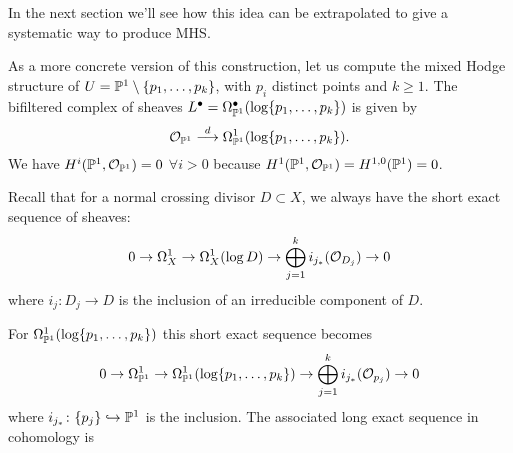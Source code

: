 \documentclass[../main.tex]{subfiles}
\begin{document}
In the next section we'll see how this idea can be extrapolated to give a systematic way to produce MHS.



\begin{es} 
\label{example-MHS3}
As a more concrete version of this construction, let us compute the mixed Hodge structure of $U = \mathbb{P}^1\setminus\{p_1,\ldots,p_k\}$, with $p_i$ distinct points and $k\ge 1$. The bifiltered complex of sheaves $L^\bullet = \Omega_{\mathbb{P}^1}^\bullet(\log \{p_1,\ldots,p_k\})$ is given by
\[\mathcal{O}_{\mathbb{P}^1}\stackrel{d}{\longrightarrow}\Omega^1_{\mathbb{P}^1}(\log\{p_1,\ldots,p_k\}).\]
We have $H^i(\mathbb{P}^1,\mathcal{O}_{\mathbb{P}^1})= 0$  $\forall i > 0$ because $H^1(\mathbb{P}^1,\mathcal{O}_{\mathbb{P}^1})=H^{1,0}(\mathbb{P}^1)=0$. 

Recall that for a normal crossing divisor $D \subset X$, we always have the short exact sequence of sheaves:
\[
0 \to \Omega^1_X \to \Omega^1_X(\log D) \to \bigoplus_{j=1}^k i_{j_*}(\mathcal{O}_{D_j}) \to 0
\]
where $i_{j} \colon D_j \to D$ is the inclusion of an irreducible component of $D$.


For  $\Omega^1_{\mathbb{P}^1}(\log\{p_1,\ldots,p_k\})$ this short exact sequence becomes
\[
0 \to \Omega^1_{\mathbb{P}^1} \to \Omega^1_{\mathbb{P}^1}(\log\{p_1,\ldots,p_k\}) \to \bigoplus_{j=1}^k i_{j_*}(\mathcal{O}_{p_j}) \to 0
\]
where $i_{j_*} \colon \{p_j\} \hookrightarrow \mathbb{P}^1$ is the inclusion.
The associated long exact sequence in cohomology is


\end{es}
\end{document}
